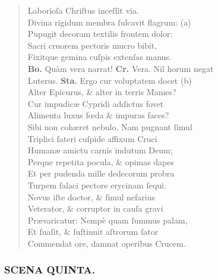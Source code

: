 \documentclass[a4paper,12pt]{article}
\begin{document}
\begin{verse}
Laborioſa Chriſtus inceſſit via.\\[0pt]
Divina rigidum membra ſulcavit flagrum: (a)\footnotemark\\[0pt]
Pupugit decoram textilis frontem dolor:\\[0pt]
Sacri cruorem pectoris mucro bibit,\\[0pt]
Fixitque gemina cuſpis extenſas manus.\\[0pt]
\textbf{Bo.} Quàm vera narrat! \textbf{Cr.} Vera. Nil horum negat\\[0pt]
Luterus. \textbf{Sta.} Ergo cur voluptatem docet (b)\footnotemark\\[0pt]
Alter Epicurus, \& alter in terris Mames?\\[0pt]
Cur impudicæ Cypridi addictus fovet\\[0pt]
Alimenta luxus fœda \& impuras faces?\\[0pt]
Sibi non cohæret nebulo. Nam pugnant ſimul\\[0pt]
Triplici fateri cuſpide affixum Cruci\\[0pt]
Humanæ amictu carnis indutum Deum;\\[0pt]
Perque repetita pocula, \& opimas dapes\\[0pt]
Et per pudenda mille dedecorum probra\\[0pt]
Turpem ſalaci pectore erycinam ſequi.\\[0pt]
Novus iſte doctor, \& ſimul nefarius\\[0pt]
Veterator, \& corruptor in cauſa gravi\\[0pt]
Prævaricatur: Nempè quam ſummus palam,\\[0pt]
Et ſuaſit, \& ſuſtinuit aſtrorum ſator\\[0pt]
Commendat ore, damnat operibus Crucem.\\[0pt]
\end{verse}

\subsubsection{SCENA QUINTA.}
\label{sec:org2c2788b}
\end{document}

